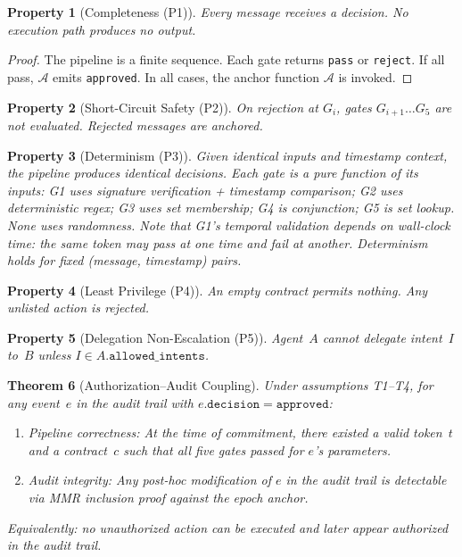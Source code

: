 \documentclass[11pt,a4paper]{article}
\newtheorem{theorem}{Theorem}[section]
\newtheorem{property}[theorem]{Property}
\begin{document}
\begin{property}[Completeness (P1)]
Every message receives a decision. No execution path produces no output.
\end{property}

\begin{proof}
The pipeline is a finite sequence. Each gate returns \texttt{pass} or \texttt{reject}. If all
pass, $\mathcal{A}$ emits \texttt{approved}. In all cases, the anchor function $\mathcal{A}$
is invoked.
\end{proof}

\begin{property}[Short-Circuit Safety (P2)]
On rejection at $G_i$, gates $G_{i+1}\ldots G_5$ are not evaluated. Rejected messages are
anchored.
\end{property}

\begin{property}[Determinism (P3)]
Given identical inputs and timestamp context, the pipeline produces identical decisions. Each
gate is a pure function of its inputs: G1 uses signature verification + timestamp comparison;
G2 uses deterministic regex; G3 uses set membership; G4 is conjunction; G5 is set lookup. None
uses randomness. Note that G1's temporal validation depends on wall-clock time: the same token
may pass at one time and fail at another. Determinism holds for fixed (message, timestamp)
pairs.
\end{property}

\begin{property}[Least Privilege (P4)]
An empty contract permits nothing. Any unlisted action is rejected.
\end{property}

\begin{property}[Delegation Non-Escalation (P5)]
Agent~$A$ cannot delegate intent~$I$ to~$B$ unless $I \in A.\texttt{allowed\_intents}$.
\end{property}

\begin{theorem}[Authorization--Audit Coupling]\label{thm:coupling}
Under assumptions T1--T4, for any event~$e$ in the audit trail with
$e.\texttt{decision} = \texttt{approved}$:
\begin{enumerate}[nosep,label=(\alph*)]
  \item \emph{Pipeline correctness:} At the time of commitment, there existed a valid
        token~$t$ and a contract~$c$ such that all five gates passed for $e$'s parameters.
  \item \emph{Audit integrity:} Any post-hoc modification of $e$ in the audit trail is
        detectable via MMR inclusion proof against the epoch anchor.
\end{enumerate}
Equivalently: no unauthorized action can be executed and later appear authorized in the
audit trail.
\end{theorem}
\end{document}
